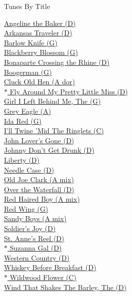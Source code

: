 \documentclass{book}
\begin{document}
\noindent
\begin{center}
\large{Tunes By Title} \\
\end{center}
\hyperlink{tunes.1}{Angeline the Baker (D)} \\
\hyperlink{tunes.1}{Arkansas Traveler (D)} \\
\hyperlink{tunes.2}{Barlow Knife (G)} \\
\hyperlink{tunes.2}{Blackberry Blossom (G)} \\
\hyperlink{tunes.3}{Bonaparte Crossing the Rhine (D)} \\
\hyperlink{tunes.3}{Boogerman (G)} \\
\hyperlink{tunes.3}{Cluck Old Hen (A dor)} \\
\hyperlink{tunes.12}{$\ast$ Fly Around My Pretty Little Miss (D)} \\
\hyperlink{tunes.4}{Girl I Left Behind Me, The (G)} \\
\hyperlink{tunes.4}{Grey Eagle (A)} \\
\hyperlink{tunes.5}{Ida Red (G)} \\
\hyperlink{tunes.6}{I'll Twine 'Mid The Ringlets (C)} \\
\hyperlink{tunes.7}{John Lover's Gone (D)} \\
\hyperlink{tunes.7}{Johnny Don't Get Drunk (D)} \\
\hyperlink{tunes.8}{Liberty (D)} \\
\hyperlink{tunes.8}{Needle Case (D)} \\
\hyperlink{tunes.9}{Old Joe Clark (A mix)} \\
\hyperlink{tunes.9}{Over the Waterfall (D)} \\
\hyperlink{tunes.10}{Red Haired Boy (A mix)} \\
\hyperlink{tunes.10}{Red Wing (G)} \\
\hyperlink{tunes.11}{Sandy Boys (A mix)} \\
\hyperlink{tunes.11}{Soldier's Joy (D)} \\
\hyperlink{tunes.12}{St. Anne's Reel (D)} \\
\hyperlink{tunes.12}{$\ast$ Suzanna Gal (D)} \\
\hyperlink{tunes.12}{Western Country (D)} \\
\hyperlink{tunes.13}{Whiskey Before Breakfast (D)} \\
\hyperlink{tunes.6}{$\ast$ Wildwood Flower (C)} \\
\hyperlink{tunes.13}{Wind That Shakes The Barley, The (D)} \\


\end{document}
